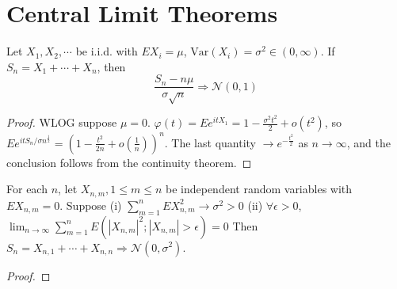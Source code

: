 \section{Central Limit Theorems}
\begin{theorem}
    Let $X_1,X_2,\cdots$ be i.i.d. with $EX_i=\mu$, $\text{Var}(X_i)=\sigma^2\in(0,\infty)$. If $S_n=X_1+\cdots+X_n$, then
    \[\frac{S_n-n\mu}{\sigma \sqrt{n}}\Longrightarrow \mathcal{N}(0,1)\] 
\end{theorem}
\begin{proof}
    WLOG suppose $\mu=0$. $\varphi(t)=Ee^{itX_1}=1-\frac{\sigma^2t^2}{2}+o(t^2)$, so $Ee^{itS_n/\sigma n^{\frac{1}{2}}}=(1-\frac{t^2}{2n}+o(\frac{1}{n}))^n$.
    The last quantity $\to e^{-\frac{t^2}{2}}$ as $n\to\infty$, and the conclusion follows from the continuity theorem.
\end{proof}

\begin{theorem}
    For each $n$, let $X_{n,m},1\le m\le n$ be independent random variables with $EX_{n,m}=0$. Suppose \newline 
    (i) $\sum_{m=1}^n EX_{n,m}^2\to \sigma^2>0$ \newline 
    (ii) $\forall \epsilon>0$, $\lim_{n\to\infty}\sum_{m=1}^nE(\left|X_{n,m}\right|^2;\left|X_{n,m}\right|>\epsilon)=0$ \newline 
    Then $S_n=X_{n,1}+\cdots+X_{n,n}\Longrightarrow \mathcal{N}(0,\sigma^2)$.
\end{theorem}
\begin{proof}
    
\end{proof}

